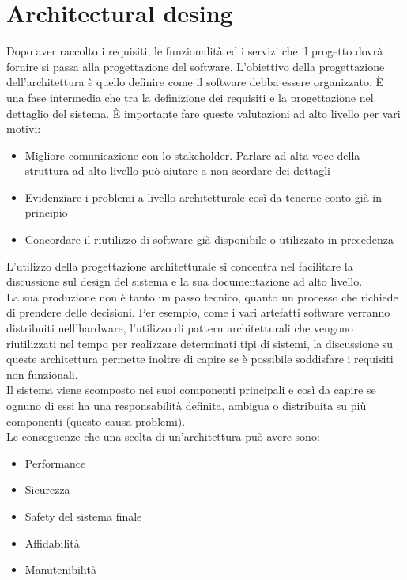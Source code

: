\section{Architectural desing}
\label{sec:06_architectural_desing}
Dopo aver raccolto i requisiti, le funzionalità ed i servizi che il progetto dovrà fornire si passa alla progettazione del software.
L'obiettivo della progettazione dell'architettura è quello definire come il software debba essere organizzato.
È una fase intermedia che tra la definizione dei requisiti e la progettazione nel dettaglio del sistema.
È importante fare queste valutazioni ad alto livello per vari motivi:
\begin{itemize}[noitemsep]
    \item Migliore comunicazione con lo stakeholder. Parlare ad alta voce della struttura ad alto livello può aiutare a non scordare dei dettagli
    \item Evidenziare i problemi a livello architetturale così da tenerne conto già in principio
    \item Concordare il riutilizzo di software già disponibile o utilizzato in precedenza
\end{itemize}
L'utilizzo della progettazione architetturale si concentra nel facilitare la discussione sul design del sistema e la sua documentazione ad alto livello.\\
La sua produzione non è tanto un passo tecnico, quanto un processo che richiede di prendere delle decisioni.
Per esempio, come i vari artefatti software verranno distribuiti nell'hardware, l'utilizzo di pattern architetturali che vengono riutilizzati nel tempo per realizzare determinati tipi di sistemi, la discussione su queste architettura permette inoltre di capire se è possibile soddisfare i requisiti non funzionali.\\
Il sistema viene scomposto nei suoi componenti principali e così da capire se ognuno di essi ha una responsabilità definita, ambigua o distribuita su più componenti (questo causa problemi).\\
Le conseguenze che una scelta di un'architettura può avere sono:
\begin{itemize}[noitemsep]
    \item Performance
    \item Sicurezza
    \item Safety del sistema finale
    \item Affidabilità
    \item Manutenibilità
\end{itemize}
